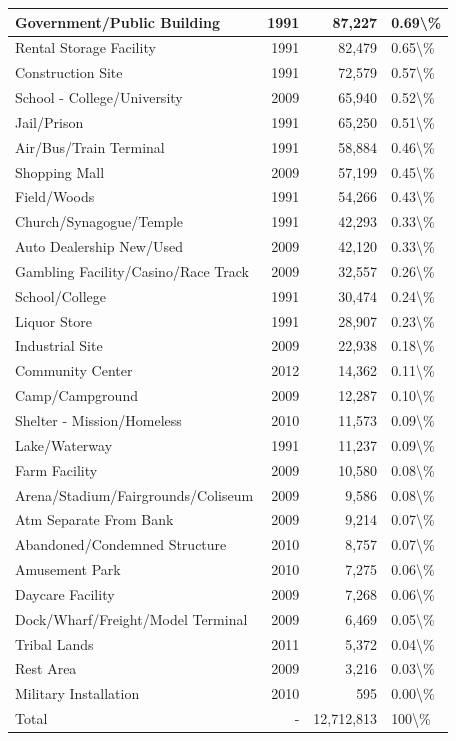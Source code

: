 \documentclass[
]{krantz}
\begin{document}
\begin{longtable}[t]{l|r|r|l}
\hline
Government/Public Building & 1991 & 87,227 & 0.69\textbackslash{}\%\\
\hline
Rental Storage Facility & 1991 & 82,479 & 0.65\textbackslash{}\%\\
\hline
Construction Site & 1991 & 72,579 & 0.57\textbackslash{}\%\\
\hline
School - College/University & 2009 & 65,940 & 0.52\textbackslash{}\%\\
\hline
Jail/Prison & 1991 & 65,250 & 0.51\textbackslash{}\%\\
\hline
Air/Bus/Train Terminal & 1991 & 58,884 & 0.46\textbackslash{}\%\\
\hline
Shopping Mall & 2009 & 57,199 & 0.45\textbackslash{}\%\\
\hline
Field/Woods & 1991 & 54,266 & 0.43\textbackslash{}\%\\
\hline
Church/Synagogue/Temple & 1991 & 42,293 & 0.33\textbackslash{}\%\\
\hline
Auto Dealership New/Used & 2009 & 42,120 & 0.33\textbackslash{}\%\\
\hline
Gambling Facility/Casino/Race Track & 2009 & 32,557 & 0.26\textbackslash{}\%\\
\hline
School/College & 1991 & 30,474 & 0.24\textbackslash{}\%\\
\hline
Liquor Store & 1991 & 28,907 & 0.23\textbackslash{}\%\\
\hline
Industrial Site & 2009 & 22,938 & 0.18\textbackslash{}\%\\
\hline
Community Center & 2012 & 14,362 & 0.11\textbackslash{}\%\\
\hline
Camp/Campground & 2009 & 12,287 & 0.10\textbackslash{}\%\\
\hline
Shelter - Mission/Homeless & 2010 & 11,573 & 0.09\textbackslash{}\%\\
\hline
Lake/Waterway & 1991 & 11,237 & 0.09\textbackslash{}\%\\
\hline
Farm Facility & 2009 & 10,580 & 0.08\textbackslash{}\%\\
\hline
Arena/Stadium/Fairgrounds/Coliseum & 2009 & 9,586 & 0.08\textbackslash{}\%\\
\hline
Atm Separate From Bank & 2009 & 9,214 & 0.07\textbackslash{}\%\\
\hline
Abandoned/Condemned Structure & 2010 & 8,757 & 0.07\textbackslash{}\%\\
\hline
Amusement Park & 2010 & 7,275 & 0.06\textbackslash{}\%\\
\hline
Daycare Facility & 2009 & 7,268 & 0.06\textbackslash{}\%\\
\hline
Dock/Wharf/Freight/Model Terminal & 2009 & 6,469 & 0.05\textbackslash{}\%\\
\hline
Tribal Lands & 2011 & 5,372 & 0.04\textbackslash{}\%\\
\hline
Rest Area & 2009 & 3,216 & 0.03\textbackslash{}\%\\
\hline
Military Installation & 2010 & 595 & 0.00\textbackslash{}\%\\
\hline
Total & - & 12,712,813 & 100\textbackslash{}\%\\
\hline
\end{longtable}
\end{document}
